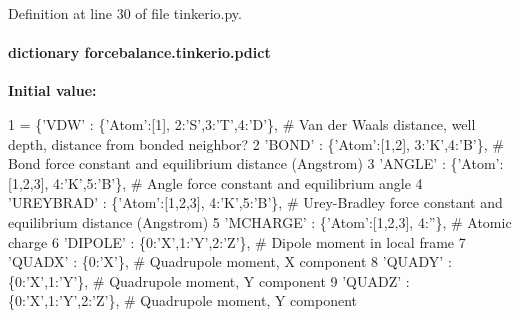Definition at line 30 of file tinkerio.\-py.

\hypertarget{namespaceforcebalance_1_1tinkerio_a714d1b926359d7d11559720e422ec34d}{
\paragraph[{pdict}]{\setlength{\rightskip}{0pt plus 5cm}dictionary forcebalance.\-tinkerio.\-pdict}}\label{namespaceforcebalance_1_1tinkerio_a714d1b926359d7d11559720e422ec34d}
{\bfseries Initial value\-:}
\begin{DoxyCode}
1 = \{\textcolor{stringliteral}{'VDW'}          : \{\textcolor{stringliteral}{'Atom'}:[1], 2:\textcolor{stringliteral}{'S'},3:\textcolor{stringliteral}{'T'},4:\textcolor{stringliteral}{'D'}\}, \textcolor{comment}{# Van der Waals distance, well depth, distance from
       bonded neighbor?}
2          \textcolor{stringliteral}{'BOND'}         : \{\textcolor{stringliteral}{'Atom'}:[1,2], 3:\textcolor{stringliteral}{'K'},4:\textcolor{stringliteral}{'B'}\},     \textcolor{comment}{# Bond force constant and equilibrium distance
       (Angstrom)}
3          \textcolor{stringliteral}{'ANGLE'}        : \{\textcolor{stringliteral}{'Atom'}:[1,2,3], 4:\textcolor{stringliteral}{'K'},5:\textcolor{stringliteral}{'B'}\},   \textcolor{comment}{# Angle force constant and equilibrium angle}
4          \textcolor{stringliteral}{'UREYBRAD'}     : \{\textcolor{stringliteral}{'Atom'}:[1,2,3], 4:\textcolor{stringliteral}{'K'},5:\textcolor{stringliteral}{'B'}\},   \textcolor{comment}{# Urey-Bradley force constant and equilibrium
       distance (Angstrom)}
5          \textcolor{stringliteral}{'MCHARGE'}       : \{\textcolor{stringliteral}{'Atom'}:[1,2,3], 4:\textcolor{stringliteral}{''}\},          \textcolor{comment}{# Atomic charge}
6          \textcolor{stringliteral}{'DIPOLE'}       : \{0:\textcolor{stringliteral}{'X'},1:\textcolor{stringliteral}{'Y'},2:\textcolor{stringliteral}{'Z'}\},             \textcolor{comment}{# Dipole moment in local frame}
7          \textcolor{stringliteral}{'QUADX'}        : \{0:\textcolor{stringliteral}{'X'}\},                         \textcolor{comment}{# Quadrupole moment, X component}
8          \textcolor{stringliteral}{'QUADY'}        : \{0:\textcolor{stringliteral}{'X'},1:\textcolor{stringliteral}{'Y'}\},                   \textcolor{comment}{# Quadrupole moment, Y component}
9          \textcolor{stringliteral}{'QUADZ'}        : \{0:\textcolor{stringliteral}{'X'},1:\textcolor{stringliteral}{'Y'},2:\textcolor{stringliteral}{'Z'}\},             \textcolor{comment}{# Quadrupole moment, Y component}

\end{DoxyCode}

